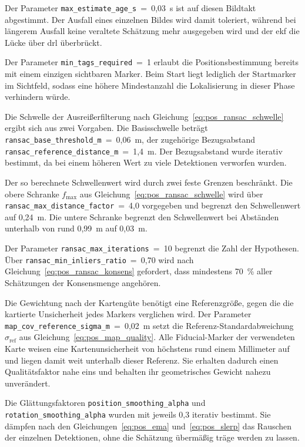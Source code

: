 Der Parameter \texttt{max\_estimate\_age\_s}~=~0,03~s ist auf diesen Bildtakt abgestimmt.
Der Ausfall eines einzelnen Bildes wird damit toleriert, während bei längerem Ausfall keine veraltete Schätzung mehr ausgegeben wird und der \gls{ekf} die Lücke über \gls{drl} überbrückt.

Der Parameter \texttt{min\_tags\_required}~=~1 erlaubt die Positionsbestimmung bereits mit einem einzigen sichtbaren Marker.
Beim Start liegt lediglich der Startmarker im Sichtfeld, sodass eine höhere Mindestanzahl die Lokalisierung in dieser Phase verhindern würde.

Die Schwelle der Ausreißerfilterung nach Gleichung~\ref{eq:pos_ransac_schwelle} ergibt sich aus zwei Vorgaben.
Die Basisschwelle beträgt \texttt{ransac\_base\_threshold\_m}~=~0,06~m, der zugehörige Bezugsabstand \texttt{ransac\_reference\_distance\_m}~=~1,4~m.
Der Bezugsabstand wurde iterativ bestimmt, da bei einem höheren Wert zu viele Detektionen verworfen wurden.


Der so berechnete Schwellenwert wird durch zwei feste Grenzen beschränkt.
Die obere Schranke $f_{\max}$ aus Gleichung~\ref{eq:pos_ransac_schwelle} wird über \texttt{ransac\_max\_distance\_factor}~=~4,0 vorgegeben und begrenzt den Schwellenwert auf 0,24~m.
Die untere Schranke begrenzt den Schwellenwert bei Abständen unterhalb von rund 0,99~m auf 0,03~m.

Der Parameter \texttt{ransac\_max\_iterations}~=~10 begrenzt die Zahl der Hypothesen.
Über \texttt{ransac\_min\_inliers\_ratio}~=~0,70 wird nach Gleichung~\ref{eq:pos_ransac_konsens} gefordert, dass mindestens 70~\% aller Schätzungen der Konsensmenge angehören.

Die Gewichtung nach der Kartengüte benötigt eine Referenzgröße, gegen die die kartierte Unsicherheit jedes Markers verglichen wird.
Der Parameter \texttt{map\_cov\_reference\_sigma\_m}~=~0,02~m setzt die Referenz-Standardabweich\-ung $\sigma_{\mathrm{ref}}$ aus Gleichung~\ref{eq:pos_map_quality}.
Alle Fiducial-Marker der verwendeten Karte weisen eine Kartenunsicherheit von höchstens rund einem Millimeter auf und liegen damit weit unterhalb dieser Referenz.
Sie erhalten dadurch einen Qualitätsfaktor nahe eins und behalten ihr geometrisches Gewicht nahezu unverändert.

Die Glättungsfaktoren \texttt{position\_smoothing\_alpha} und \texttt{rotation\_smoothing\_alpha} wurden mit jeweils 0,3 iterativ bestimmt.
Sie dämpfen nach den Gleichungen~\ref{eq:pos_ema} und~\ref{eq:pos_slerp} das Rauschen der einzelnen Detektionen, ohne die Schätzung übermäßig träge werden zu lassen.


